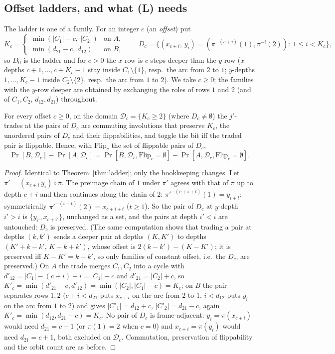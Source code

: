 \subsection{Offset ladders, and what (L) needs}\label{sec:ladderoffset}

The ladder is one of a family.  For an integer $c$ (an \emph{offset}) put
\[
K_c=\begin{cases}\min(|C_1|-c,\ |C_2|)&\text{on }A,\\
\min(d_{21}-c,\ d_{12})&\text{on }B,\end{cases}
\qquad
D_c=\bigl\{(x_{c+i},\,y_i)=(\pi^{-(c+i)}(1),\pi^{-i}(2)):\ 1\le i<K_c\bigr\},
\]
so $D_0$ is the ladder and for $c>0$ the $x$-row is $c$ steps deeper
than the $y$-row ($x$-depths $c+1,\dots,c+K_c-1$ stay inside
$C_1\setminus\{1\}$, resp.\ the arc from $2$ to $1$; $y$-depths
$1,\dots,K_c-1$ inside $C_2\setminus\{2\}$, resp.\ the arc from $1$ to
$2$).  We take $c\ge0$; the families with the $y$-row deeper are
obtained by exchanging the roles of rows $1$ and $2$ (and of
$C_1,C_2$, $d_{12},d_{21}$) throughout.

\begin{theorem}\label{thm:ladderoffset}
For every offset $c\ge0$, on the domain $\mathcal D_c=\{K_c\ge2\}$
(where $D_c\ne\emptyset$) the $j'$-trades at the pairs of $D_c$ are commuting
involutions that preserve $K_c$, the unordered pairs of $D_c$ and their
flippabilities, and toggle the bit iff the traded pair is flippable.
Hence, with $\mathrm{Flip}_c$ the set of flippable pairs of $D_c$,
\[
\Pr[B,\mathcal D_c]-\Pr[A,\mathcal D_c]
=\Pr[B,\mathcal D_c,\mathrm{Flip}_c=\emptyset]-\Pr[A,\mathcal D_c,\mathrm{Flip}_c=\emptyset].
\]
\end{theorem}

\begin{proof}
Identical to Theorem~\ref{thm:ladder}; only the bookkeeping changes.
Let $\pi'=(x_{c+i}\,y_i)\circ\pi$.  The preimage chain of $1$ under
$\pi'$ agrees with that of $\pi$ up to depth $c+i$ and then continues
along the chain of $2$: $\pi'^{-(c+i+t)}(1)=y_{i+t}$; symmetrically
$\pi'^{-(i+t)}(2)=x_{c+i+t}$ ($t\ge1$).  So the pair of $D_c$ at
$y$-depth $i'>i$ is $\{y_{i'},x_{c+i'}\}$, unchanged as a set, and the
pairs at depth $i'<i$ are untouched: $D_c$ is preserved.  (The same
computation shows that trading a pair at depths $(k,k')$ sends a
deeper pair at depths $(K,K')$ to depths $(K'+k-k',\,K-k+k')$, whose
offset is $2(k-k')-(K-K')$; it is preserved iff $K-K'=k-k'$, so only
families of constant offset, i.e.\ the $D_c$, are preserved.)  On $A$
the trade merges $C_1,C_2$ into a cycle with
$d'_{12}=|C_1|-(c+i)+i=|C_1|-c$ and $d'_{21}=|C_2|+c$, so
$K'_c=\min(d'_{21}-c,d'_{12})=\min(|C_2|,|C_1|-c)=K_c$; on $B$ the pair
separates rows $1,2$ ($c+i<d_{21}$ puts $x_{c+i}$ on the arc from $2$
to $1$, $i<d_{12}$ puts $y_i$ on the arc from $1$ to $2$) and gives
$|C'_1|=d_{12}+c$, $|C'_2|=d_{21}-c$, again
$K'_c=\min(d_{12},d_{21}-c)=K_c$.  No pair of $D_c$ is frame-adjacent:
$y_i=\pi(x_{c+i})$ would need $d_{21}=c-1$ (or $\pi(1)=2$ when $c=0$)
and $x_{c+i}=\pi(y_i)$ would need $d_{21}=c+1$, both excluded on
$\mathcal D_c$.  Commutation,
preservation of flippability and the orbit count are as before.
\end{proof}

